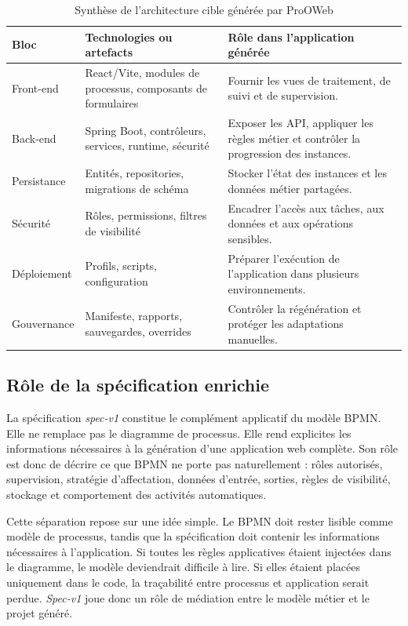 \begin{table}[H]
\centering
\small
\caption{Synthèse de l'architecture cible générée par ProOWeb}
\label{tab:chap3-architecture-cible}
\begin{tabular}{p{3.4cm}p{4.8cm}p{5.6cm}}
\hline
\textbf{Bloc} & \textbf{Technologies ou artefacts} & \textbf{Rôle dans l'application générée} \\
\hline
Front-end & React/Vite, modules de processus, composants de formulaires & Fournir les vues de traitement, de suivi et de supervision. \\
Back-end & Spring Boot, contrôleurs, services, runtime, sécurité & Exposer les API, appliquer les règles métier et contrôler la progression des instances. \\
Persistance & Entités, repositories, migrations de schéma & Stocker l'état des instances et les données métier partagées. \\
Sécurité & Rôles, permissions, filtres de visibilité & Encadrer l'accès aux tâches, aux données et aux opérations sensibles. \\
Déploiement & Profils, scripts, configuration & Préparer l'exécution de l'application dans plusieurs environnements. \\
Gouvernance & Manifeste, rapports, sauvegardes, overrides & Contrôler la régénération et protéger les adaptations manuelles. \\
\hline
\end{tabular}
\end{table}

\label{sec:chap3-spec}

\subsection{Rôle de la spécification enrichie}

La spécification \textit{spec-v1} constitue le complément applicatif du modèle BPMN. Elle ne remplace pas le diagramme de processus. Elle rend explicites les informations nécessaires à la génération d'une application web complète. Son rôle est donc de décrire ce que BPMN ne porte pas naturellement : rôles autorisés, supervision, stratégie d'affectation, données d'entrée, sorties, règles de visibilité, stockage et comportement des activités automatiques.

Cette séparation repose sur une idée simple. Le BPMN doit rester lisible comme modèle de processus, tandis que la spécification doit contenir les informations nécessaires à l'application. Si toutes les règles applicatives étaient injectées dans le diagramme, le modèle deviendrait difficile à lire. Si elles étaient placées uniquement dans le code, la traçabilité entre processus et application serait perdue. \textit{Spec-v1} joue donc un rôle de médiation entre le modèle métier et le projet généré.

